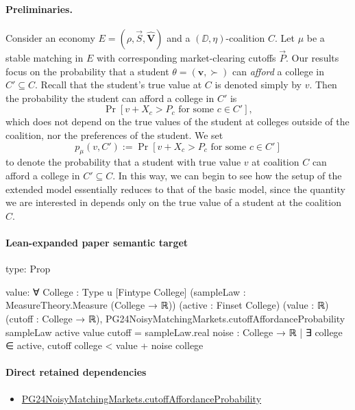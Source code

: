 \documentclass[10pt]{article}
\begin{document}
\begin{ReviewVerbatim}
\paragraph{Preliminaries.}
Consider an economy $E = (\rho, \vec{S}, \hat{\bm{V}})$ and a $(\DD, \eta)$-coalition $C$. Let $\mu$ be a stable matching in $E$ with corresponding market-clearing cutoffs $\vec{P}$. Our results focus on the probability that a student $\theta=(\bm{v},\succ)$ can \textit{afford} a college in $C'\subseteq C$. Recall that the student's true value at $C$ is denoted simply by $v$. Then the probability the student can afford a college in $C'$ is
\begin{equation}
    \Pr[v + X_c > P_c\text{ for some $c\in C'$}],
\end{equation}
which does not depend on the true values of the student at colleges outside of the coalition, nor the preferences of the student. We set
\begin{equation}
    p_\mu(v, C') := \Pr[v + X_c > P_c\text{ for some $c\in C'$}]
\end{equation}
to denote the probability that a student with true value $v$ at coalition $C$ can afford a college in $C'\subseteq C$. In this way, we can begin to see how the setup of the extended model essentially reduces to that of the basic model, since the quantity we are interested in depends only on the true value of a student at the coalition $C$.
\end{ReviewVerbatim}



\paragraph{Lean-expanded paper semantic target}
\begin{ReviewVerbatim}
type:
Prop

value:
∀ {College : Type u} [Fintype College] (sampleLaw : MeasureTheory.Measure (College → ℝ)) (active : Finset College)
  (value : ℝ) (cutoff : College → ℝ),
  PG24NoisyMatchingMarkets.cutoffAffordanceProbability sampleLaw active value cutoff =
    sampleLaw.real {noise : College → ℝ | ∃ college ∈ active, cutoff college < value + noise college}
\end{ReviewVerbatim}

\paragraph{Direct retained dependencies}
\begin{itemize}\raggedright
\item \hyperlink{governing-declaration-a4a2a08d89f647e4}{PG24\allowbreak{}Noisy\allowbreak{}Matching\allowbreak{}Markets.\allowbreak{}cutoff\allowbreak{}Affordance\allowbreak{}Probability}
\end{itemize}
\end{document}
